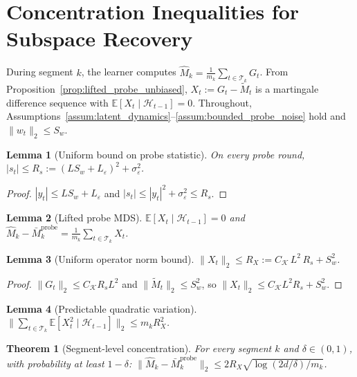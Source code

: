 \documentclass{article}
\newcommand{\E}{\mathbb{E}}
\newcommand{\cH}{\mathcal{H}}
\newcommand{\cT}{\mathcal{T}}
\newtheorem{lemma}{Lemma}
\newtheorem{theorem}{Theorem}
\begin{document}
\section{Concentration Inequalities for Subspace Recovery}
\label{app:concentration}

During segment $k$, the learner computes $\widehat{M}_k = \frac{1}{m_k} \sum_{t \in \cT_k} G_t$.
From Proposition~\ref{prop:lifted_probe_unbiased}, $X_t := G_t - \widetilde{M}_t$ is a martingale difference sequence with $\E[X_t \mid \cH_{t-1}] = 0$.
Throughout, Assumptions~\ref{assum:latent_dynamics}--\ref{assum:bounded_probe_noise} hold and $\|w_t\|_2 \le S_w$.

\begin{lemma}[Uniform bound on probe statistic]
\label{lem:st_uniform_bound}
On every probe round, $|s_t| \le R_s := (LS_w + L_\varepsilon)^2 + \sigma_\varepsilon^2$.
\end{lemma}

\begin{proof}
$|y_t| \le LS_w + L_\varepsilon$ and $|s_t| \le |y_t|^2 + \sigma_\varepsilon^2 \le R_s$.
\end{proof}

\begin{lemma}[Lifted probe MDS]
\label{lem:lifted_mds}
$\E[X_t \mid \cH_{t-1}] = 0$ and $\widehat{M}_k - \bar{M}_k^{\mathrm{probe}} = \frac{1}{m_k}\sum_{t \in \cT_k} X_t$.
\end{lemma}

\begin{lemma}[Uniform operator norm bound]
\label{lem:uniform_operator_bound}
$\|X_t\|_2 \le R_X := C_{\mathcal K}\,L^2\,R_s + S_w^2$.
\end{lemma}

\begin{proof}
$\|G_t\|_2 \le C_{\mathcal K} R_s L^2$ and $\|\widetilde{M}_t\|_2 \le S_w^2$, so $\|X_t\|_2 \le C_{\mathcal K} L^2 R_s + S_w^2$.
\end{proof}

\begin{lemma}[Predictable quadratic variation]
\label{lem:variance_bound}
$\|\sum_{t \in \cT_k} \E[X_t^2 \mid \cH_{t-1}]\|_2 \le m_k R_X^2$.
\end{lemma}

\begin{theorem}[Segment-level concentration]
\label{thm:matrix_concentration_app}
For every segment $k$ and $\delta \in (0,1)$, with probability at least $1-\delta$:
$\|\widehat{M}_k - \bar{M}_k^{\mathrm{probe}}\|_2 \le 2R_X \sqrt{\log(2d/\delta)/m_k}$.
\end{theorem}
\end{document}
